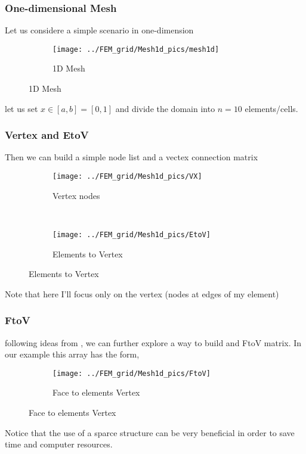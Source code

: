 \begin{frame} \frametitle{One-dimensional Mesh}
	Let us considere a simple scenario in one-dimension
	\begin{figure}
		\centering
		\begin{subfigure}[b]{0.70\textwidth}
			\centering
			\texttt{[image: ../FEM\_grid/Mesh1d\_pics/mesh1d]}
			\caption{1D Mesh}
			\label{fig:uniform_mesh_1d}
		\end{subfigure}%
	\end{figure}
	let us set $x \in [a,b] = [0,1]$ and divide the domain into $n = 10$ elements/cells.
\end{frame}

\begin{frame} \frametitle{Vertex and EtoV}
	Then we can build a simple node list and a vectex connection matrix
	\begin{figure}
        \centering
        \begin{subfigure}[b]{0.20\textwidth}
                \centering
                \texttt{[image: ../FEM\_grid/Mesh1d\_pics/VX]}
                \caption{Vertex nodes}
                \label{fig:VX}
        \end{subfigure}%
				~ %
        \begin{subfigure}[b]{0.70\textwidth}
                \centering
                \texttt{[image: ../FEM\_grid/Mesh1d\_pics/EtoV]}
                \caption{Elements to Vertex}
                \label{fig:EtoV}
				\end{subfigure}
				\label{fig:Nodal Grid}
	\end{figure}
	Note that here I'll focus only on the vertex (nodes at edges of my element)
\end{frame}

\begin{frame} \frametitle{FtoV}
	following ideas from \cite{Karup2012}, we can further explore a way to build and FtoV matrix. 
	In our example this array has the form,
	\begin{figure}
		\centering
		\begin{subfigure}[b]{0.70\textwidth}
			\centering
			\texttt{[image: ../FEM\_grid/Mesh1d\_pics/FtoV]}
			\caption{Face to elements Vertex}
			\label{fig:FtoV}
		\end{subfigure}%
	\end{figure}
	Notice that the use of a sparce structure can be very beneficial in order to save time and computer resources.
\end{frame}


